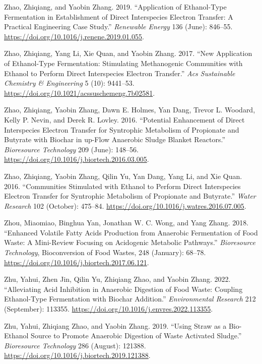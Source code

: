 \documentclass[11pt]{report}
\begin{document}
\begin{hangparas}{1.5em}{1}
\hypertarget{citeproc_bib_item_99}{Zhao, Zhiqiang, and Yaobin Zhang. 2019. “Application of Ethanol-Type Fermentation in Establishment of Direct Interspecies Electron Transfer: A Practical Engineering Case Study.” \textit{Renewable Energy} 136 (June): 846–55. \url{https://doi.org/10.1016/j.renene.2019.01.055}.}

\hypertarget{citeproc_bib_item_100}{Zhao, Zhiqiang, Yang Li, Xie Quan, and Yaobin Zhang. 2017. “New Application of Ethanol-Type Fermentation: Stimulating Methanogenic Communities with Ethanol to Perform Direct Interspecies Electron Transfer.” \textit{Acs Sustainable Chemistry \& Engineering} 5 (10): 9441–53. \url{https://doi.org/10.1021/acssuschemeng.7b02581}.}

\hypertarget{citeproc_bib_item_101}{Zhao, Zhiqiang, Yaobin Zhang, Dawn E. Holmes, Yan Dang, Trevor L. Woodard, Kelly P. Nevin, and Derek R. Lovley. 2016. “Potential Enhancement of Direct Interspecies Electron Transfer for Syntrophic Metabolism of Propionate and Butyrate with Biochar in up-Flow Anaerobic Sludge Blanket Reactors.” \textit{Bioresource Technology} 209 (June): 148–56. \url{https://doi.org/10.1016/j.biortech.2016.03.005}.}

\hypertarget{citeproc_bib_item_102}{Zhao, Zhiqiang, Yaobin Zhang, Qilin Yu, Yan Dang, Yang Li, and Xie Quan. 2016. “Communities Stimulated with Ethanol to Perform Direct Interspecies Electron Transfer for Syntrophic Metabolism of Propionate and Butyrate.” \textit{Water Research} 102 (October): 475–84. \url{https://doi.org/10.1016/j.watres.2016.07.005}.}

\hypertarget{citeproc_bib_item_103}{Zhou, Miaomiao, Binghua Yan, Jonathan W. C. Wong, and Yang Zhang. 2018. “Enhanced Volatile Fatty Acids Production from Anaerobic Fermentation of Food Waste: A Mini-Review Focusing on Acidogenic Metabolic Pathways.” \textit{Bioresource Technology}, Bioconversion of Food Wastes, 248 (January): 68–78. \url{https://doi.org/10.1016/j.biortech.2017.06.121}.}

\hypertarget{citeproc_bib_item_104}{Zhu, Yahui, Zhen Jin, Qilin Yu, Zhiqiang Zhao, and Yaobin Zhang. 2022. “Alleviating Acid Inhibition in Anaerobic Digestion of Food Waste: Coupling Ethanol-Type Fermentation with Biochar Addition.” \textit{Environmental Research} 212 (September): 113355. \url{https://doi.org/10.1016/j.envres.2022.113355}.}

\hypertarget{citeproc_bib_item_105}{Zhu, Yahui, Zhiqiang Zhao, and Yaobin Zhang. 2019. “Using Straw as a Bio-Ethanol Source to Promote Anaerobic Digestion of Waste Activated Sludge.” \textit{Bioresource Technology} 286 (August): 121388. \url{https://doi.org/10.1016/j.biortech.2019.121388}.}


\end{hangparas}
\end{document}
